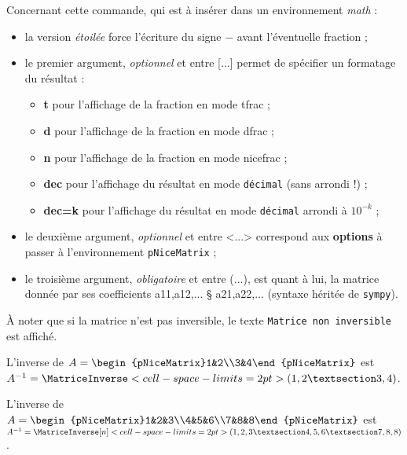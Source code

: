\documentclass[a4paper,11pt]{article}
\newcommand\Cle[1]{{\bfseries\sffamily\textlangle #1\textrangle}}
\begin{document}
\begin{tipblock}
Concernant cette commande, qui est à insérer dans un environnement \textit{math} :

\begin{itemize}
	\item la version \textit{étoilée} force l'écriture du signe \og $-$ \fg{} avant l'éventuelle fraction ;
	\item le premier argument, \textit{optionnel} et entre \textsf{[...]} permet de spécifier un formatage du résultat :
	\begin{itemize}
		\item \Cle{t} pour l'affichage de la fraction en mode \textsf{tfrac} ;
		\item \Cle{d} pour l'affichage de la fraction en mode \textsf{dfrac} ;
		\item \Cle{n} pour l'affichage de la fraction en mode \textsf{nicefrac} ;
		\item \Cle{dec} pour l'affichage du résultat en mode \texttt{décimal} (sans arrondi !) ;
		\item \Cle{dec=k} pour l'affichage du résultat en mode \texttt{décimal} arrondi à $10^{-k}$ ;
	\end{itemize}
	\item le deuxième argument, \textit{optionnel} et entre \textsf{<...>} correspond aux \Cle{options} à passer à l'environnement \texttt{pNiceMatrix} ;
	\item le troisième argument, \textit{obligatoire} et entre \textsf{(...)}, est quant à lui, la matrice donnée par ses coefficients \textsf{a11,a12,... § a21,a22,...} (syntaxe héritée de \texttt{sympy}).
\end{itemize}
À noter que si la matrice n'est pas inversible, le texte \texttt{Matrice non inversible} est affiché.
\end{tipblock}

\begin{PresentationCode}{}
L'inverse de $A=\begin{pNiceMatrix}1&2\\3&4\end{pNiceMatrix}$ est
$A^{-1}=\MatriceInverse<cell-space-limits=2pt>(1,2 § 3,4)$.
\end{PresentationCode}

\begin{PresentationCode}{}
L'inverse de $A=\begin{pNiceMatrix}1&2&3\\4&5&6\\7&8&8\end{pNiceMatrix}$ est
$A^{-1}=\MatriceInverse[n]<cell-space-limits=2pt>(1,2,3 § 4,5,6 § 7,8,8)$.
\end{PresentationCode}
\end{document}
